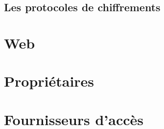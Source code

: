 \subsection{Les protocoles de chiffrements}

\section{Web}

\section{Propriétaires}

\section{Fournisseurs d'accès}
